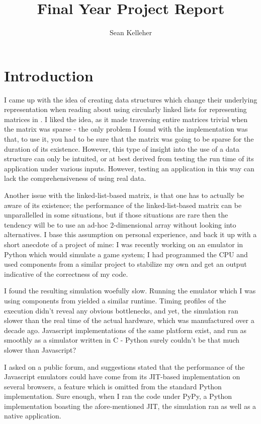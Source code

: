 \documentclass{report}
\title{Final Year Project Report}
\author{Sean Kelleher}
\begin{document}
\maketitle

\tableofcontents

\chapter{Introduction}

I came up with the idea of creating data structures which change their
underlying representation when reading about using circularly linked lists for
representing matrices in \cite{Knuth:97}. I liked the idea, as it made
traversing entire matrices trivial when the matrix was sparse - the only problem
I found with the implementation was that, to use it, you had to be sure that the
matrix was going to be sparse for the duration of its existence. However, this
type of insight into the use of a data structure can only be intuited, or at
best derived from testing the run time of its application under various inputs.
However, testing an application in this way can lack the comprehensiveness of
using real data.

Another issue with the linked-list-based matrix, is that one has to actually be
aware of its existence; the performance of the linked-list-based matrix can be
unparallelled in some situations, but if those situations are rare then the
tendency will be to use an ad-hoc 2-dimensional array without looking into
alternatives. I base this assumption on personal experience, and back it up with
a short anecdote of a project of mine: I was recently working on an emulator in
Python which would simulate a game system; I had programmed the CPU and used
components from a similar project to stabilize my own and get an output
indicative of the correctness of my code.

I found the resulting simulation woefully slow. Running the emulator which I was
using components from yielded a similar runtime. Timing profiles of the
execution didn't reveal any obvious bottlenecks, and yet, the simulation ran
slower than the real time of the actual hardware, which was manufactured over a
decade ago. Javascript implementations of the same platform exist, and run as
smoothly as a simulator written in C - Python surely couldn't be that much
slower than Javascript?

I asked on a public forum, and suggestions stated that the performance of the
Javascript emulators could have come from its JIT-based implementation on
several browsers, a feature which is omitted from the standard Python
implementation. Sure enough, when I ran the code under PyPy, a Python
implementation boasting the afore-mentioned JIT, the simulation ran as well as a
native application.
\end{document}
